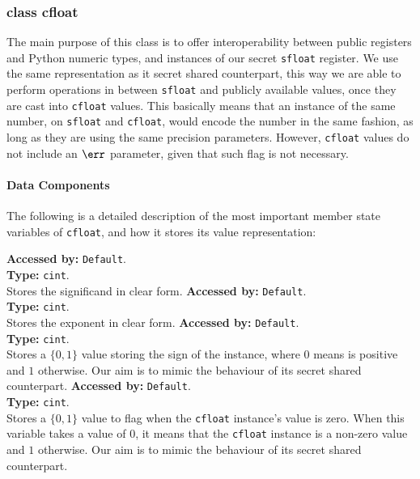 \begin{mylisting}
\subsubsection{class cfloat}
The main purpose of this class is to offer interoperability between public registers 
and Python numeric types, and instances of our secret \verb|sfloat| register. 
We use the same representation as it secret shared counterpart, 
this way we are able to perform operations in between \verb|sfloat| and publicly available values, 
once they are cast into \verb|cfloat| values.
This basically means that an instance of the same number, on \verb|sfloat| and \verb|cfloat|, 
would  encode the number in the same fashion, 
as long as they are using the same precision parameters. 
However, \verb|cfloat| values do not include an $\err$ parameter, 
given that such flag is not necessary.

\paragraph{Data Components}
		The following is a detailed description of the most important member state variables of \verb|cfloat|, and how it stores its value representation:
		
		\textbf{Accessed by:} \verb|Default|.\\
		\textbf{Type:} \verb|cint|.\\
		Stores the significand in clear form.
		\textbf{Accessed by:} \verb|Default|.\\
		\textbf{Type:} \verb|cint|.\\
		Stores the  exponent in clear form.
		\textbf{Accessed by:} \verb|Default|.\\
		\textbf{Type:} \verb|cint|.\\
		Stores a $\{0,1\}$ value storing the sign of the instance, 
		where $0$ means is positive and $1$ otherwise. 
		Our aim is to mimic the behaviour of its secret shared counterpart.
		\textbf{Accessed by:} \verb|Default|.\\
		\textbf{Type:} \verb|cint|.\\
		Stores a $\{0,1\}$ value to flag when the \verb|cfloat| 
		instance's value is zero. 
		When this variable takes a value of $0$, it means that the \verb|cfloat| 
		instance is a non-zero value and $1$ otherwise. 
		Our aim is to mimic the behaviour of its secret shared counterpart.


\end{mylisting}

